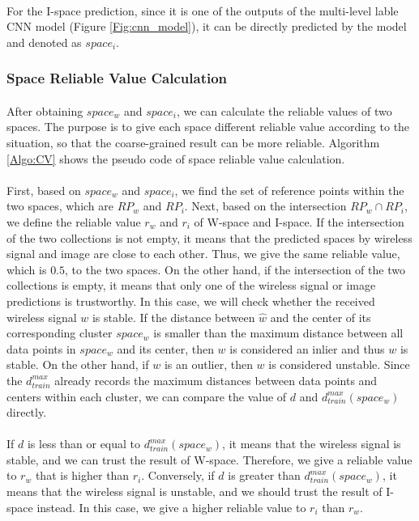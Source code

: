 \documentclass[a4paper,12pt]{report}
\begin{document}
\paragraph{}
For the I-space prediction, since it is one of the outputs of the multi-level lable CNN model (Figure \ref{Fig:cnn_model}), it can be directly predicted by the model and denoted as $space_i$.

\subsubsection{Space Reliable Value Calculation}
\paragraph{}
After obtaining $space_w$ and $space_i$, we can calculate the reliable values of two spaces. The purpose is to give each space different reliable value according to the situation, so that the coarse-grained result can be more reliable. Algorithm \ref{Algo:CV} shows the pseudo code of space reliable value calculation.
\paragraph{}
First, based on $space_w$ and $space_i$, we find the set of reference points within the two spaces, which are $RP_w$ and $RP_i$. Next, based on the intersection $RP_w\cap RP_i$, we define the reliable value $r_w$ and $r_i$ of W-space and I-space. If the intersection of the two collections is not empty, it means that the predicted spaces by wireless signal and image are close to each other. Thus, we give the same reliable value, which is $0.5$, to the two spaces. On the other hand, if the intersection of the two collections is empty, it means that only one of the wireless signal or image predictions is trustworthy. In this case, we will check whether the received wireless signal $w$ is stable. If the distance between $\hat{w}$ and the center of its corresponding cluster $space_w$ is smaller than the maximum distance between all data points in $space_w$ and its center, then $w$ is considered an inlier and thus $w$ is stable. On the other hand, if $w$ is an outlier, then $w$ is considered unstable. Since the $d_{train}^{max}$ already records the maximum distances between data points and centers within each cluster, we can compare the value of $d$ and $d_{train}^{max}(space_w)$ directly.
\paragraph{}
If $d$ is less than or equal to $d_{train}^{max}(space_w)$, it means that the wireless signal is stable, and we can trust the result of W-space. Therefore, we give a reliable value to $r_w$ that is higher than $r_i$. Conversely, if $d$ is greater than $d_{train}^{max}(space_w)$, it means that the wireless signal is unstable, and we should trust the result of I-space instead. In this case, we give a higher reliable value to $r_i$ than $r_w$.
\end{document}
